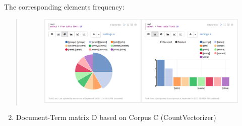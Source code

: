 \documentclass[letterpaper,11pt,english]{sphinxmanual}
\begin{document}
The corresponding elements frequency:
\begin{quote}
\begin{figure}[htbp]
\centering

\includegraphics{demo_freq.png}
\label{socialnetwork:fig-namefreq}\end{figure}
\end{quote}
\begin{enumerate}
\setcounter{enumi}{1}
\item {} 
Document-Term matrix D based on Corpus C (CountVectorizer)

\end{enumerate}
\end{document}
